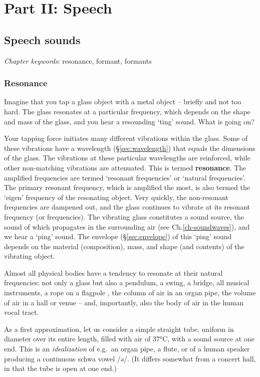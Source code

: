 \documentclass[
]{book}
\begin{document}
\part*{Part II: Speech}\label{part-part-ii-speech}

\chapter{Speech sounds}\label{ch-speechsounds}

\emph{Chapter keywords}: resonance, formant, formants

\section{Resonance}\label{resonance}

Imagine that you tap a glass object with a metal object -- briefly and not too hard. The glass resonates at a particular frequency, which depends on the shape and mass of the glass, and you hear a resounding `ting' sound. What is going on?

Your tapping force initiates many different vibrations within the glass. Some of these vibrations have a wavelength (§\ref{sec:wavelength}) that equals the dimensions of the glass. The vibrations at these particular wavelengths are reinforced, while other non-matching vibrations are attenuated. This is termed \textbf{resonance}. The amplified frequencies are termed `resonant frequencies' or `natural frequencies'. The primary resonant frequency, which is amplified the most, is also termed the `eigen' frequency of the resonating object. Very quickly, the non-resonant frequencies are dampened out, and the glass continues to vibrate at its resonant frequency (or frequencies). The vibrating glass constitutes a sound source, the sound of which propagates in the surrounding air (see Ch.\ref{ch-soundwaves}), and we hear a `ping' sound. The envelope (§\ref{sec:envelope}) of this `ping' sound depends on the material (composition), mass, and shape (and contents) of the vibrating object.

Almost all physical bodies have a tendency to resonate at their natural frequencies: not only a glass but also a pendulum, a swing, a bridge, all musical instruments, a rope on a flagpole \citep[§61]{Minnaert_1970v2}, the column of air in an organ pipe, the volume of air in a hall or venue -- and, importantly, also the body of air in the human vocal tract.

As a first approximation, let us consider a simple straight tube, uniform in diameter over its entire length, filled with air of 37°C, with a sound source at one end. This is an \emph{idealization} of e.g.~an organ pipe, a flute, or of a human speaker producing a continuous schwa vowel /ə/. (It differs somewhat from a concert hall, in that the tube is open at one end.)
\end{document}
